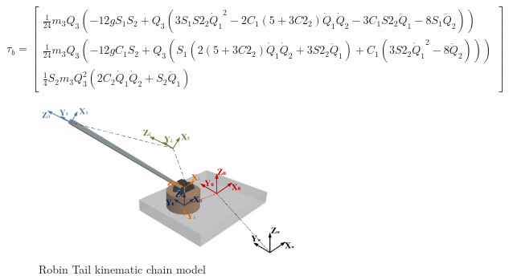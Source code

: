 \begin{equation}
\tau_b=\begin{bmatrix}
\frac{1}{24} m_3 Q_3 \left(-12 g S_1 S_2+Q_3 \left(3 S_1 S2_2 {\dot{Q}_1}^2-2 C_1\left(5+3 C2_2\right) \dot{Q}_1 \dot{Q}_2-3 C_1 S2_2 \ddot{Q}_1-8 S_1 \ddot{Q}_2\right)\right)\\
\frac{1}{24} m_3 Q_3 \left(-12 g C_1 S_2+Q_3 \left(S_1\left( 2(5+3C2_2)\dot{Q}_1 \dot{Q}_2+3S2_2\ddot{Q}_1\right)+C_1(3S2_2{\dot{Q}_1}^2-8\ddot{Q}_2)\right)\right)\\
\frac{1}{4} S_2 m_3 Q_3^2 \left(2 C_2 \dot{Q}_1 \dot{Q}_2+S_2 \ddot{Q}_1\right)
\end{bmatrix}
\end{equation}

\begin{figure}
	\centering
	\includegraphics[width=85mm]{./pictures/RobinRepic.pdf}
	\caption{Robin Tail kinematic chain model}
	\label{fig:rmax}
\end{figure}


